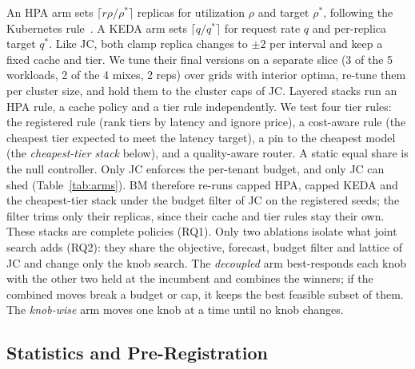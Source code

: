 \documentclass[conference,a4paper]{IEEEtran}
\newcommand{\jcac}{JC}
\newcommand{\jcac}{JCAC}
\begin{document}
An HPA arm sets $\lceil r\rho/\rho^\ast\rceil$ replicas for
utilization $\rho$ and target $\rho^\ast$, following the Kubernetes
rule~\cite{k8shpa}. A KEDA arm sets $\lceil q/q^\ast\rceil$ for request
rate $q$ and per-replica target $q^\ast$. Like \jcac{}, both clamp replica
changes to $\pm2$ per interval and keep a fixed cache and tier. We tune
their final versions on a separate slice (3 of the 5 workloads, 2 of the 4
mixes, 2 reps) over grids with interior optima,
re-tune them per cluster size, and hold them to the cluster caps of \jcac{}. Layered
stacks run an HPA rule, a cache policy and a tier rule independently. We
test four tier rules: the registered rule (rank tiers by latency and ignore
price), a cost-aware rule (the cheapest tier expected to meet the latency
target), a pin to the cheapest model (the \emph{cheapest-tier stack}
below), and a quality-aware router. A static equal share is the null
controller. Only \jcac{} enforces the per-tenant budget, and only \jcac{}
can shed (Table~\ref{tab:arms}). BM therefore re-runs capped HPA, capped KEDA
and the cheapest-tier stack under the budget filter of \jcac{} on the
registered seeds; the filter trims only their replicas, since their cache
and tier rules stay their own. These stacks are complete policies (RQ1).
Only two ablations isolate what joint search adds (RQ2): they share the
objective, forecast, budget filter and lattice of \jcac{} and change only
the knob search. The \emph{decoupled} arm best-responds each knob with the
other two held at the incumbent and combines the winners; if the combined
moves break a budget or cap, it keeps the best feasible subset of them. The
\emph{knob-wise} arm moves one knob at a time until no knob changes.

\begin{table}[!t]
\caption{Registered Campaigns: Seven Core, Four Follow-Ups. Points: Design
Points or BurstGPT Windows; PASS: $p$-Valued Tests Passed, Excluding
Equivalence Readings (JN, QL, HO, WD, TA, CS; All Held). BM Runs Three New
Arms Against Registered Rows.}
\label{tab:campaigns}
\centering
\scriptsize
\setlength{\tabcolsep}{3.2pt}

\end{table}

\subsection{Statistics and Pre-Registration}
\label{sec:stats}
\end{document}
